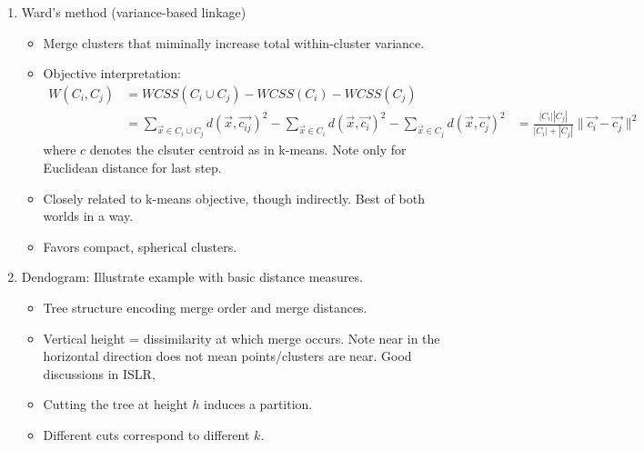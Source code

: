 \documentclass{article}
\begin{document}
\begin{enumerate}
\begin{enumerate}
\item Cluster-cluster distance (linkage)
\begin{itemize}
\item Requires a linkage function $D(C_a,C_b)$ for clusters $C_a, C_b$.
\item Common choices:
\[
\text{Single / Minimum / Nearest neighbor: } D(C_a,C_b) = \min_{x \in C_a, y \in C_b} d(x,y)
\]
Allows long, thin, winding, non-convex clusters. Connectivity matters, global compactness does not.
\[
\text{Complete / Maximum / Farthest neighbor: } D(C_a,C_b) = \max{x \in C_a, y \in C_b} d(x,y)
\]
Produces compact, spherical clusters and penalizes irregular shapes. Sensitive to outliers.
\[
\text{Average: } D(C_a,C_b) = \frac{1}{|C_a| |C_b|} \sum_{x \in C_a} \sum_{y \in C_b} d(x,y)
\]
\[
\text{Mean / Centroid: } D(C_a,C_b) = |m_a - m_b|
\]
Average and mean are compromise between single and complete linkage. 
\end{itemize}
\item Linkage choice encodes shape assumptions. Distance metric also important per above discussion (what similar should mean in application).
\end{enumerate}

\item Ward's method (variance-based linkage)
\begin{itemize}
\item Merge clusters that miminally increase total within-cluster variance.
\item Objective interpretation:
\begin{align*}
W (C_i, C_j) &= WCSS(C_i \cup C_j) -  WCSS(C_i) -  WCSS(C_j) \\
&= \sum_{\vec{x} \in C_i \cup C_j} d(\vec{x}, \vec{c_{ij}})^2 -  \sum_{\vec{x} \in C_i} d(\vec{x}, \vec{c_{i}})^2 -  \sum_{\vec{x} \in C_j} d(\vec{x}, \vec{c_{j}})^2
&= \frac{|C_i||C_j|}{|C_i|+|C_j|} \| \vec{c_i} - \vec{c_j} \|^2
\end{align*}
where $c$ denotes the clsuter centroid as in k-means. Note only for Euclidean distance for last step.
\item Closely related to k-means objective, though indirectly. Best of both worlds in a way.
\item Favors compact, spherical clusters.
\end{itemize}

\item Dendogram: Illustrate example with basic distance measures.
\begin{itemize}
\item Tree structure encoding merge order and merge distances.
\item Vertical height = dissimilarity at which merge occurs. Note near in the horizontal direction does not mean points/clusters are near. Good discussions in ISLR,
\item Cutting the tree at height $h$ induces a partition.
\item Different cuts correspond to different $k$.
\end{itemize}


\end{enumerate}
\end{document}
